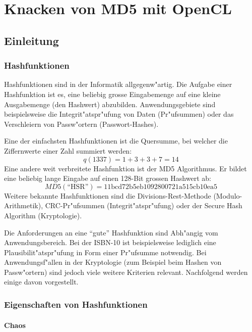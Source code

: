 \chapter{Knacken von MD5 mit OpenCL}
\begin{refsection}



\section{Einleitung}

\subsection{Hashfunktionen}

Hashfunktionen sind in der Informatik allgegenw"artig. Die Aufgabe einer
Hashfunktion ist es, eine beliebig grosse Eingabemenge auf eine kleine
Ausgabemenge (den Hashwert) abzubilden. Anwendungsgebiete sind beispielsweise
die Integrit"atspr"ufung von Daten (Pr"ufsummen) oder das Verschleiern von
Passw"ortern (Passwort-Hashes).

Eine der einfachsten Hashfunktionen ist die Quersumme, bei welcher die
Ziffernwerte einer Zahl summiert werden:
\[
	q(1337) = 1 + 3 + 3 + 7 = 14
\]
Eine andere weit verbreitete Hashfunktion ist der MD5 Algorithmus. Er bildet
eine beliebig lange Eingabe auf einen 128-Bit grossen Hashwert ab:
\[
	MD5(\textrm{``HSR''}) = \textrm{11bcd72b5eb1092800721a515cb10ea5}
\]
Weitere bekannte Hashfunktionen sind die Divisions-Rest-Methode
(Modulo-Arithmetik), CRC-Pr"ufsummen (Integrit"atspr"ufung) oder der Secure Hash
Algorithm (Kryptologie).

Die Anforderungen an eine ``gute'' Hashfunktion sind Abh"angig vom
Anwendungsbereich. Bei der ISBN-10 ist beispielsweise lediglich eine
Plausibilit"atspr"ufung in Form einer Pr"ufsumme notwendig. Bei
Anwendungsf"allen in der Kryptologie (zum Beispiel beim Hashen von Passw"ortern)
sind jedoch viele weitere Kriterien relevant. Nachfolgend werden einige davon
vorgestellt.

\subsection{Eigenschaften von Hashfunktionen}
\label{crypto:hashfunktionen:eigenschaften}

\subsubsection{Chaos}


\end{refsection}
